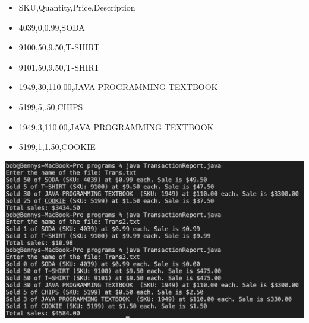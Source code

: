 \documentclass{article}
\begin{document}
\begin{itemize}
    \item SKU,Quantity,Price,Description 
    \item 4039,0,0.99,SODA
    \item 9100,50,9.50,T-SHIRT
    \item 9101,50,9.50,T-SHIRT
    \item 1949,30,110.00,JAVA PROGRAMMING TEXTBOOK 
    \item 5199,5,.50,CHIPS
    \item 1949,3,110.00,JAVA PROGRAMMING TEXTBOOK 
    \item 5199,1,1.50,COOKIE
\end{itemize}
\begin{center}
\includegraphics[width=\textwidth]{./images/Transaction.png}
\end{center}
\end{document}
